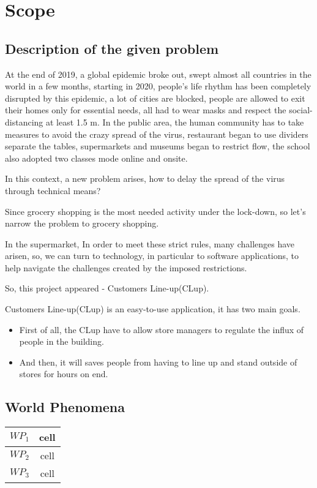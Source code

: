 \documentclass[a4paper,12pt]{book}
\begin{document}
\section{Scope}
\subsection{Description of the given problem}

At the end of 2019, a global epidemic broke out, swept almost all countries in the world in a few months, starting in 2020, people's life rhythm has been completely disrupted by this epidemic, a lot of cities are blocked, people are allowed to exit their homes only for essential needs, all had to wear masks and respect the social-distancing at least 1.5 m. In the public area, the human community has to take measures to avoid the crazy spread of the virus, restaurant began to use dividers separate the tables, supermarkets and museums began to restrict flow, the school also adopted two classes mode online and onsite.

In this context, a new problem arises, how to delay the spread of the virus through technical means? 

Since grocery shopping is the most needed activity under the lock-down, so let’s narrow the problem to grocery shopping.

In the supermarket, In order to meet these strict rules, many challenges have arisen, so, we can turn to technology, in particular to software applications, to help navigate the challenges created by the imposed restrictions.

So, this project appeared - Customers Line-up(CLup).


Customers Line-up(CLup) is an easy-to-use application, it has two main goals. 
\begin{itemize}
	\item  First of all, the CLup have to allow store managers to regulate the influx of people in the building.
	\item  And then, it will saves people from having to line up and stand outside of stores for hours on end.	
\end{itemize}

\subsection{World Phenomena}
\begin{center}
	\begin{tabular}{ c|c } 
		\hline
		$WP_1$ & cell \\ 
		\hline
		$WP_2$ & cell \\ 
		\hline
		$WP_3$ & cell \\ 
		\hline
	\end{tabular}
\end{center}
\end{document}
